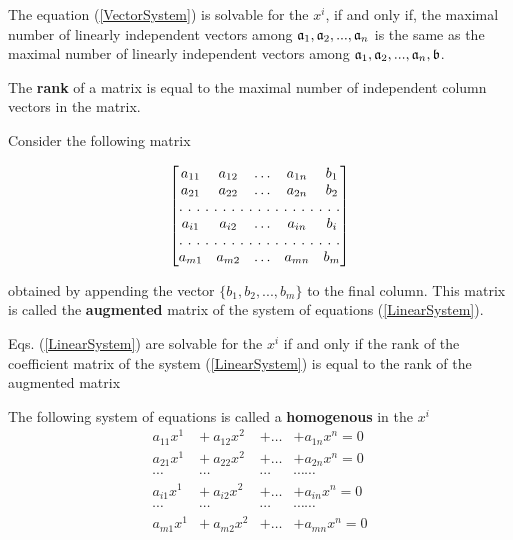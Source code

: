 \begin{theorem}
The equation (\ref{VectorSystem}) is solvable for the $x^i$, if and only if, the maximal number of linearly independent vectors among $\mathfrak{a}_1, \mathfrak{a}_2, ..., \mathfrak{a}_n$ is the same as the maximal number of linearly independent 
vectors among $\mathfrak{a}_1, \mathfrak{a}_2, ..., \mathfrak{a}_n, \mathfrak{b}$.
\end{theorem}

\begin{definition}
The {\bf rank} of a matrix is equal to the maximal number of independent column vectors in the matrix. \\ 
\end{definition}

Consider the following matrix

\[
\begin{bmatrix}
a_{11} & a_{12}  & \hdots & a_{1n}  & b_1\\
a_{21} & a_{22}  & \hdots & a_{2n}  & b_2\\
\hdotsfor[2]{5}\\
a_{i1} & a_{i2}  & \hdots & a_{in}  & b_i \\
\hdotsfor[2]{5}\\
a_{m1} & a_{m2}  & \hdots & a_{mn}  & b_m\\
\end{bmatrix}
\]

obtained by appending the vector $\{b_1, b_2, ..., b_m\}$ to the final column. This matrix is called the {\bf augmented} matrix of the system of equations (\ref{LinearSystem}).

\begin{theorem}
Eqs. (\ref{LinearSystem}) are solvable for the $x^i$ if and only if the rank of the coefficient matrix of the system (\ref{LinearSystem}) is equal to the rank of the augmented matrix
\end{theorem}

The following system of equations is called a {\bf homogenous} {\elevenit in the $x^i$}
\begin{equation}
\begin{array}{cccc}
a_{11}x^1  &+ ~a_{12}x^2   & + \hdots  &+  a_{1n}x^n   = 0 \\
a_{21}x^1  &+ ~ a_{22}x^2   &+ \hdots  &+  a_{2n}x^n   = 0 \\
 \cdots       &\cdots            &\cdots      &\cdots                \cdots \\
a_{i1}x^1   &+  ~a_{i2}x^2    & + \hdots  &+  a_{in}x^n    = 0 \\
 \cdots       &\cdots            &\cdots      &\cdots                 \cdots\\
a_{m1}x^1 &+  ~a_{m2}x^2 & + \hdots  & +  a_{mn}x^n = 0 \\
\end{array}
\label{HomogenousSystem}
\end{equation}

